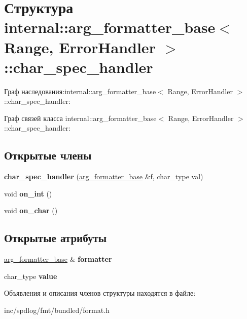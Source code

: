 \hypertarget{structinternal_1_1arg__formatter__base_1_1char__spec__handler}{}\section{Структура internal\+:\+:arg\+\_\+formatter\+\_\+base$<$ Range, Error\+Handler $>$\+:\+:char\+\_\+spec\+\_\+handler}
\label{structinternal_1_1arg__formatter__base_1_1char__spec__handler}


Граф наследования\+:internal\+:\+:arg\+\_\+formatter\+\_\+base$<$ Range, Error\+Handler $>$\+:\+:char\+\_\+spec\+\_\+handler\+:


Граф связей класса internal\+:\+:arg\+\_\+formatter\+\_\+base$<$ Range, Error\+Handler $>$\+:\+:char\+\_\+spec\+\_\+handler\+:
\subsection*{Открытые члены}
\begin{DoxyCompactItemize}
\item 
\mbox{\label{structinternal_1_1arg__formatter__base_1_1char__spec__handler_a0b5e5d4b04d79476109deb929c63ff90}} 
{\bfseries char\+\_\+spec\+\_\+handler} (\hyperlink{classinternal_1_1arg__formatter__base}{arg\+\_\+formatter\+\_\+base} \&f, char\+\_\+type val)
\item 
\mbox{\label{structinternal_1_1arg__formatter__base_1_1char__spec__handler_a9b5ed03268cefdc26a60d9b31b074d23}} 
void {\bfseries on\+\_\+int} ()
\item 
\mbox{\label{structinternal_1_1arg__formatter__base_1_1char__spec__handler_a79b5fafd0ea07812cc54a2708e91dcb4}} 
void {\bfseries on\+\_\+char} ()
\end{DoxyCompactItemize}
\subsection*{Открытые атрибуты}
\begin{DoxyCompactItemize}
\item 
\mbox{\label{structinternal_1_1arg__formatter__base_1_1char__spec__handler_ac285bfbc4ef4d70f0ef52c4444847d5d}} 
\hyperlink{classinternal_1_1arg__formatter__base}{arg\+\_\+formatter\+\_\+base} \& {\bfseries formatter}
\item 
\mbox{\label{structinternal_1_1arg__formatter__base_1_1char__spec__handler_a8c9d8e426ab114130f3e36e427768ebd}} 
char\+\_\+type {\bfseries value}
\end{DoxyCompactItemize}


Объявления и описания членов структуры находятся в файле\+:\begin{DoxyCompactItemize}
\item 
inc/spdlog/fmt/bundled/format.\+h\end{DoxyCompactItemize}
